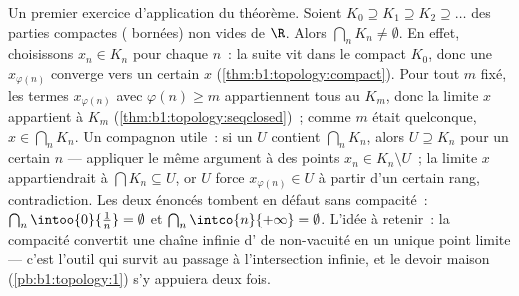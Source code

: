 \begin{example}\label{ex:b1:topology:nested}
Un premier exercice d'application du théorème. Soient $K_0 \supseteq
K_1 \supseteq K_2 \supseteq \dots$ des parties compactes (
bornées) non vides de $\R$. Alors $\bigcap_n K_n \neq \emptyset$. En
effet, choisissons $x_n \in K_n$ pour chaque $n$~: la suite vit
dans le compact $K_0$, donc une  $x_{\varphi(n)}$
converge vers un certain $x$ (\cref{thm:b1:topology:compact}). Pour
tout $m$ fixé, les termes $x_{\varphi(n)}$ avec $\varphi(n) \geq m$
appartiennent tous au  $K_m$, donc la limite $x$ appartient à
$K_m$ (\cref{thm:b1:topology:seqclosed})~; comme $m$ était
quelconque, $x \in \bigcap_n K_n$. Un compagnon utile~: si un 
$U$ contient $\bigcap_n K_n$, alors $U \supseteq K_n$ pour un certain
$n$ --- appliquer le même argument à des points $x_n \in K_n
\setminus U$~; la limite $x$ appartiendrait à $\bigcap K_n \subseteq
U$, or $U$  force $x_{\varphi(n)} \in U$ à partir d'un certain
rang, contradiction. Les deux énoncés tombent en défaut sans
compacité~: $\bigcap_n \intoo{0}{\frac 1n} = \emptyset$ et
$\bigcap_n \intco{n}{+\infty} = \emptyset$.
L'idée à retenir~: la compacité convertit une chaîne infinie
d' de non-vacuité en un unique point limite --- c'est
l'outil qui survit au passage à l'intersection infinie, et le devoir
maison (\cref{pb:b1:topology:1}) s'y appuiera deux fois.
\end{example}

